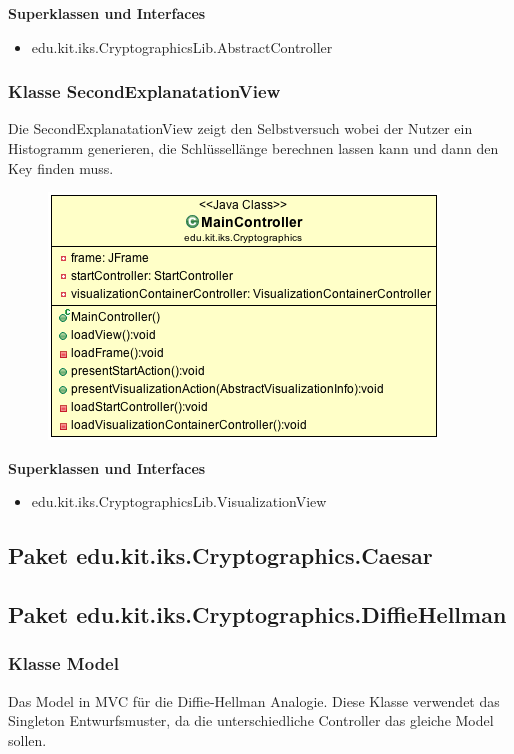 \documentclass{article}
\begin{document}
      \textbf{Superklassen und Interfaces}
      \begin{itemize}
        \item edu.kit.iks.CryptographicsLib.AbstractController
      \end{itemize}

    \subsubsection{Klasse SecondExplanatationView}
      Die SecondExplanatationView zeigt den Selbstversuch wobei der Nutzer ein Histogramm generieren, die Schlüssellänge berechnen lassen kann und dann den Key finden muss.
      \begin{figure}[H]
        \centering
        \includegraphics[width=\textwidth]{resources/edu-kit-iks-Cryptographics-MainController}
      \end{figure}

      \textbf{Superklassen und Interfaces}
      \begin{itemize}
        \item edu.kit.iks.CryptographicsLib.VisualizationView
      \end{itemize}

\subsection{Paket edu.kit.iks.Cryptographics.Caesar}

\subsection{Paket edu.kit.iks.Cryptographics.DiffieHellman}
\subsubsection{Klasse Model}
      Das Model in MVC für die Diffie-Hellman Analogie.
      Diese Klasse verwendet das Singleton Entwurfsmuster,
      da die unterschiedliche Controller das gleiche Model sollen.
\end{document}
